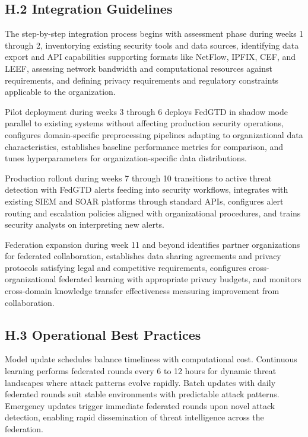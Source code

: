 \documentclass[12pt,a4paper]{article}
\theoremstyle{definition}
\begin{document}
\subsection{H.2 Integration Guidelines}

The step-by-step integration process begins with assessment phase during weeks 1 through 2, inventorying existing security tools and data sources, identifying data export and API capabilities supporting formats like NetFlow, IPFIX, CEF, and LEEF, assessing network bandwidth and computational resources against requirements, and defining privacy requirements and regulatory constraints applicable to the organization.

Pilot deployment during weeks 3 through 6 deploys FedGTD in shadow mode parallel to existing systems without affecting production security operations, configures domain-specific preprocessing pipelines adapting to organizational data characteristics, establishes baseline performance metrics for comparison, and tunes hyperparameters for organization-specific data distributions.

Production rollout during weeks 7 through 10 transitions to active threat detection with FedGTD alerts feeding into security workflows, integrates with existing SIEM and SOAR platforms through standard APIs, configures alert routing and escalation policies aligned with organizational procedures, and trains security analysts on interpreting new alerts.

Federation expansion during week 11 and beyond identifies partner organizations for federated collaboration, establishes data sharing agreements and privacy protocols satisfying legal and competitive requirements, configures cross-organizational federated learning with appropriate privacy budgets, and monitors cross-domain knowledge transfer effectiveness measuring improvement from collaboration.

\subsection{H.3 Operational Best Practices}

Model update schedules balance timeliness with computational cost. Continuous learning performs federated rounds every 6 to 12 hours for dynamic threat landscapes where attack patterns evolve rapidly. Batch updates with daily federated rounds suit stable environments with predictable attack patterns. Emergency updates trigger immediate federated rounds upon novel attack detection, enabling rapid dissemination of threat intelligence across the federation.
\end{document}
